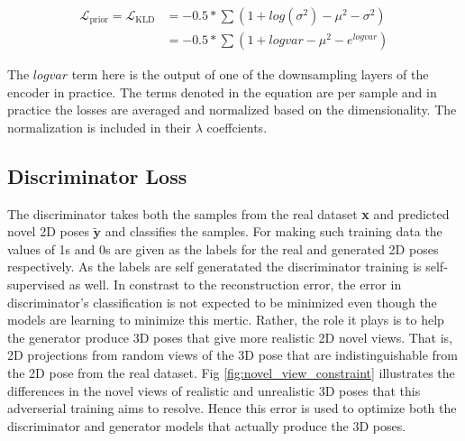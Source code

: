 \begin{equation} \label{eqn:loss_kld}
    \begin{split}
        \mathcal{L}_{\text {prior}} = \mathcal{L}_{\text {KLD}} &= -0.5 * \sum (1 + log(\sigma^2) - \mu^2 - \sigma^2) \\
        &= -0.5 * \sum (1 + logvar - \mu^2 - e^{logvar})
    \end{split}
\end{equation}

The $logvar$ term here is the output of one of the downsampling layers of the encoder in practice. The terms denoted in the equation are per sample and in practice the losses are averaged and normalized based on the dimensionality. The normalization is included in their $\lambda$ coeffcients.

\subsection{Discriminator Loss}

The discriminator takes both the samples from the real dataset \textbf{x} and predicted novel 2D poses $\tilde{\textbf{y}}$ and classifies the samples. For making such training data the values of 1s and 0s are given as the labels for the real and generated 2D poses respectively. As the labels are self generatated the discriminator training is self-supervised as well. In constrast to the reconstruction error, the error in discriminator's classification is not expected to be minimized even though the models are learning to minimize this mertic. Rather, the role it plays is to help the generator produce 3D poses that give more realistic 2D novel views. That is, 2D projections from random views of the 3D pose that are indistinguishable from the 2D pose from the real dataset. Fig \ref{fig:novel_view_constraint} illustrates the differences in the novel views of realistic and unrealistic 3D poses that this adverserial training aims to resolve. Hence this error is used to optimize both the discriminator and generator models that actually produce the 3D poses.

